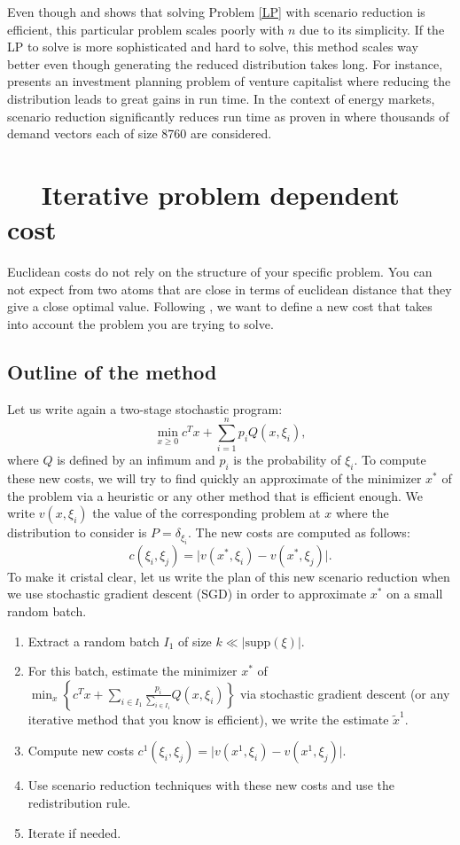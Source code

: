 \documentclass{amsart}
\begin{document}
Even though  and  shows that solving Problem \ref{LP} with scenario reduction is efficient, this particular problem scales poorly with $n$ due to its simplicity. If the LP to solve is more sophisticated and hard to solve, this method scales way better even though generating the reduced distribution takes long. For instance, \cite[Section 5.2]{rujeerapaiboon_scenario_2022} presents an investment planning problem of venture capitalist where reducing the distribution leads to great gains in run time. In the context of energy markets, scenario reduction significantly reduces run time as proven in \cite{morales_scenario_2009} where thousands of demand vectors each of size 8760 are considered.

\section{$\quad$ Iterative problem dependent cost}
Euclidean costs do not rely on the structure of your specific problem. You can not expect from two atoms that are close in terms of euclidean distance that they give a close optimal value. Following , we want to define a new cost that takes into account the problem you are trying to solve.
\subsection{Outline of the method}
Let us write again a two-stage stochastic program:
$$
\min_{x\geq 0}c^Tx+\sum_{i=1}^np_iQ\left(x,\xi_i\right),
$$
where $Q$ is defined by an infimum and $p_i$ is the probability of $\xi_i$. To compute these new costs, we will try to find quickly an approximate of the minimizer $x^*$ of the problem via a heuristic or any other method that is efficient enough. We write $v\left(x,\xi_i\right)$ the value of the corresponding problem at $x$ where the distribution to consider is $P=\delta_{\xi_i}$. The new costs are computed as follows:
$$
c\left(\xi_i,\xi_j\right)=\lvert v\left(x^*,\xi_i\right)-v\left(x^*,\xi_j\right)\rvert.
$$
To make it cristal clear, let us write the plan of this new scenario reduction when we use stochastic gradient descent (SGD) in order to approximate $x^*$ on a small random batch.
\begin{enumerate}
    \item Extract a random batch $I_1$ of size $k\ll \lvert \text{supp}\left(\xi\right)\rvert$.
    \item For this batch, estimate the minimizer $x^*$ of $\min_{x}\left\{c^Tx+\sum_{i\in I_1}\frac{p_i}{\sum_{i\in I_1}}Q\left(x,\xi_i\right)\right\}$ via stochastic gradient descent (or any iterative method that you know is efficient), we write the estimate $\tilde{x}^1$.
    \item Compute new costs $c^1\left(\xi_i,\xi_j\right)=\lvert v\left(x^1,\xi_i\right)-v\left(x^1,\xi_j\right)\rvert$.
    \item Use scenario reduction techniques with these new costs and use the redistribution rule.
    \item Iterate if needed.
\end{enumerate}
\end{document}

